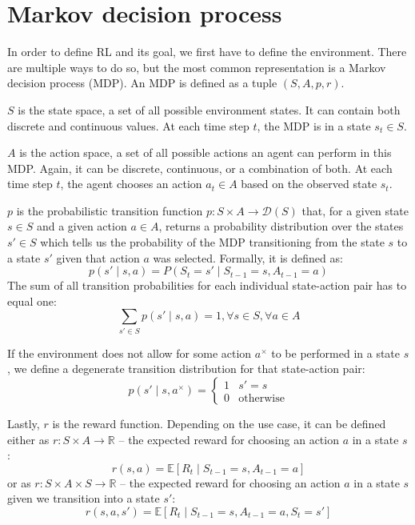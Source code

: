 \documentclass[
  digital,     %
  oneside,     %
  nosansbold,  %
  nocolorbold, %
  lof,         %
  lot,         %
]{fithesis4}
\begin{document}
\section{Markov decision process}
In order to define RL and its goal, we first have to define the environment. There are multiple ways to do so, but the most common representation is a Markov decision process (MDP). An MDP is defined as a tuple $(S, A, p, r)$.

$S$ is the state space, a set of all possible environment states. It can contain both discrete and continuous values. At each time step $t$, the MDP is in a state $s_t\in S$.

$A$ is the action space, a set of all possible actions an agent can perform in this MDP. Again, it can be discrete, continuous, or a combination of both. At each time step $t$, the agent chooses an action $a_t\in A$ based on the observed state $s_t$.

$p$ is the probabilistic transition function $p\colon S \times A \to \mathcal{D}(S)$ that, for a given state $s\in S$ and a given action $a\in A$, returns a probability distribution over the states $s'\in S$ which tells us the probability of the MDP transitioning from the state $s$ to a state $s'$ given that action $a$ was selected. Formally, it is defined as:
\begin{equation}
p(s' \mid s,a)=P(S_t=s'\mid S_{t-1}=s,A_{t-1}=a)    
\end{equation}
The sum of all transition probabilities for each individual state-action pair has to equal one:
\begin{equation}
\sum_{s'\in S} p(s'\mid s,a)=1, \forall s \in S, \forall a \in A
\end{equation}

If the environment does not allow for some action $a^{\times}$ to be performed in a state $s$, we define a degenerate transition distribution for that state-action pair:
\begin{equation}
    p(s'\mid s, a^{\times}) =\begin{cases}1 & s' = s\\0 & \text{otherwise} \end{cases} 
\end{equation}

Lastly, $r$ is the reward function. Depending on the use case, it can be defined either as $r\colon S \times A \to \mathbb{R}$ \cite{PA230} -- the expected reward for choosing an action $a$ in a state $s$:
\begin{equation}
r(s,a)= \mathbb{E} [R_t\mid S_{t-1}=s, A_{t-1}=a]
\end{equation}
or as $r\colon S\times A \times S \to \mathbb{R}$ -- the expected reward for choosing an action $a$ in a state $s$ given we transition into a state $s'$:
\begin{equation}
r(s, a, s')= \mathbb{E} [R_t\mid S_{t-1}=s, A_{t-1}=a, S_t=s']
\end{equation}
\end{document}
